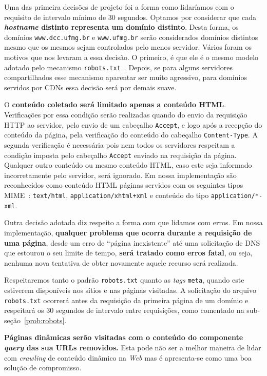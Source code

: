 \documentclass[10pt,twocolumn]{article}
\begin{document}
Uma das primeira decisões de projeto foi a forma como lidaríamos com o
requisito de intervalo mínimo de 30 segundos. Optamos por considerar que
cada \textbf{\emph{hostname} distinto representa um domínio distinto}.
Desta forma, os domínios \texttt{www.dcc.ufmg.br} e \texttt{www.ufmg.br}
serão considerados domínios distintos mesmo que os mesmos sejam
controlados pelo menos servidor. Vários foram os motivos que nos levaram
a essa decisão. O primeiro, é que ele é o mesmo modelo adotado pelo
mecanismo \texttt{robots.txt}~\cite{robotstxt}. Depois, se para alguns
servidores compartilhados esse mecanismo aparentar ser muito agressivo,
para domínios servidos por CDNs essa decisão será por demais suave.

O \textbf{conteúdo coletado será limitado apenas a conteúdo HTML}.
Verificações por essa condição serão realizadas quando do envio da
requisição HTTP ao
servidor, pelo envio de um cabeçalho \texttt{Accept}, e logo após a
recepção do conteúdo da página, pela verificação do conteúdo do
cabeçalho \texttt{Content-Type}. A segunda
verificação é necessária pois nem todos os servidores respeitam a
condição imposta pelo cabeçalho \texttt{Accept} enviado na requisição da
página. Qualquer outro
conteúdo ou mesmo conteúdo HTML, caso este seja informado incorretamente pelo
servidor, será ignorado. Em nossa implementação são reconhecidos como
conteúdo HTML páginas servidos com os seguintes tipos
MIME~\cite{xhtml1, html4tr, xhtmlmediatypes, rfc3236}:
\texttt{text/html}, \texttt{application/xhtml+xml} e conteúdo do tipo
\texttt{application/\emph{*}-xml}.

Outra decisão adotada diz respeito a forma com que lidamos com erros. Em
nossa implementação, \textbf{qualquer problema que ocorra durante a requisição
de uma página}, desde um erro de ``página inexistente'' até uma
solicitação de DNS que estourou o seu limite de tempo, \textbf{será tratado
como erros fatal}, ou seja, nenhuma nova tentativa de obter novamente
aquele recurso será realizada.

Respeitaremos tanto o padrão \texttt{robots.txt} quanto as
\emph{tags} \texttt{meta}, quando este estiverem disponíveis nos sítios
e nas páginas visitadas. A solicitação do arquivo \texttt{robots.txt}
ocorrerá antes da requisição da primeira página de um domínio e
respeitará os 30 segundos de intervalo entre requisições, como comentado
na sub-seção~\ref{prob:robots}.

\textbf{Páginas dinâmicas serão visitadas com o conteúdo do componente
\emph{query} das sua URLs removidos.} Esta pode não ser a melhor maneira
de lidar com \emph{crawling} de conteúdo dinâmico na \emph{Web} mas é
apresenta-se como uma boa solução de compromisso.
\end{document}
